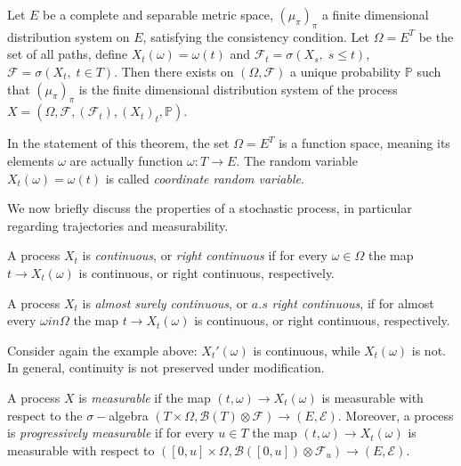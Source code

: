 \begin{theorem}
    Let $E$ be a complete and separable metric space, $(\mu_{\pi})_{\pi}$ a finite dimensional distribution system on $E$, satisfying the consistency condition. Let $\Omega = E^T$ be the set of all paths, define $X_t(\omega) = \omega(t)$ and $\mathcal{F}_t = \sigma(X_s, \; s\leq t)$, $\mathcal{F} = \sigma(X_t, \; t \in T)$. Then there exists on $(\Omega, \mathcal{F})$ a unique probability $\mathbb{P}$ such that $(\mu_{\pi})_{\pi}$ is the finite dimensional distribution system of the process $X = (\Omega, \mathcal{F}, (\mathcal{F}_t), (X_t)_t, \mathbb{P})$. 
\end{theorem}

In the statement of this theorem, the set $\Omega = E^T$ is a function space, meaning its elements $\omega$ are actually function $\omega : T \to E$. The random variable $X_t(\omega) = \omega(t)$ is called \textit{coordinate random variable}. 

We now briefly discuss the properties of a stochastic process, in particular regarding trajectories and measurability. 

\begin{definition}
    A process $X_t$ is \textit{continuous}, or \textit{right continuous} if for every $\omega \in \Omega$ the map $t \to X_t(\omega)$ is continuous, or right continuous, respectively.
\end{definition}
\begin{definition}
    A process $X_t$ is \textit{almost surely continuous}, or $a.s$ \textit{right continuous}, if for almost every $\omega in \Omega$ the map $t \to X_t(\omega)$ is continuous, or right continuous, respectively. 
\end{definition}


Consider again the example above: $X_t'(\omega)$ is continuous, while $X_t(\omega)$ is not. In general, continuity is not preserved under modification. 

\begin{definition}
    A process $X$ is \textit{measurable} if the map $(t,\omega) \to X_t(\omega)$ is measurable with respect to the $\sigma-$algebra $(T\times \Omega,\mathcal{B}(T) \otimes \mathcal{F}) \to (E,\mathcal{E})$. Moreover, a process is \textit{progressively measurable} if  for every $u \in T$ the map $(t,\omega) \to X_t(\omega)$ is measurable with respect to $([0,u] \times \Omega, \mathcal{B}([0,u]) \otimes \mathcal{F}_u) \to (E,\mathcal{E})$. 
\end{definition}

